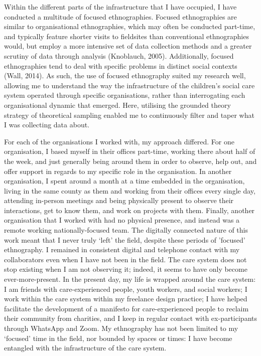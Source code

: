 Within the different parts of the infrastructure that I have occupied, I have conducted a multitude of focused ethnographies. Focused ethnographies are similar to organisational ethnographies, which may often be conducted part-time, and typically feature shorter visits to fieldsites than conventional ethnographies would, but employ a more intensive set of data collection methods and a greater scrutiny of data through analysis (Knoblauch, 2005). Additionally, focused ethnographies tend to deal with specific problems in distinct social contexts (Wall, 2014). As such, the use of focused ethnography suited my research well, allowing me to understand the way the infrastructure of the children's social care system operated through specific organisations, rather than interrogating each organisational dynamic that emerged. Here, utilising the grounded theory strategy of theoretical sampling \cite{charmaz_constructing_2006, 96} enabled me to continuously filter and taper what I was collecting data about. 

For each of the organisations I worked with, my approach differed. For one organisation, I based myself in their offices part-time, working there about half of the week, and just generally being around them in order to observe, help out, and offer support in regards to my specific role in the organisation. In another organisation, I spent around a month at a time embedded in the organisation, living in the same county as them and working from their offices every single day, attending in-person meetings and being physically present to observe their interactions, get to know them, and work on projects with them. Finally, another organisation that I worked with had no physical presence, and instead was a remote working nationally-focused team. The digitally connected nature of this work meant that I never truly ‘left’ the field, despite these periods of 'focused' ethnography. I remained in consistent digital and telephone contact with my collaborators even when I have not been in the field. The care system does not stop existing when I am not observing it; indeed, it seems to have only become ever-more-present. In the present day, my life is wrapped around the care system: I am friends with care-experienced people, youth workers, and social workers; I work within the care system within my freelance design practice; I have helped facilitate the development of a manifesto for care-experienced people to reclaim their community from charities, and I keep in regular contact with ex-participants through WhatsApp and Zoom. My ethnography has not been limited to my ‘focused’ time in the field, nor bounded by spaces or times: I have become entangled with the infrastructure of the care system.

